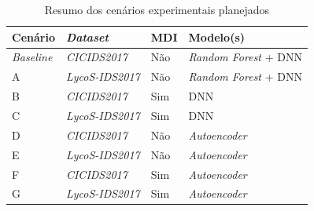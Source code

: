 \begin{table}[H]
\centering
\caption{Resumo dos cenários experimentais planejados}
\label{tab:cenarios_resumo}
\begin{tabular}{llll}
\hline
\textbf{Cenário} & \textbf{\textit{Dataset}} & \textbf{MDI} & \textbf{Modelo(s)} \\
\hline
\textit{Baseline} & \textit{CICIDS2017}    & Não & \textit{Random Forest} + DNN \\
A                 & \textit{LycoS-IDS2017} & Não & \textit{Random Forest} + DNN \\
B                 & \textit{CICIDS2017}    & Sim & DNN \\
C                 & \textit{LycoS-IDS2017} & Sim & DNN \\
D                 & \textit{CICIDS2017}    & Não & \textit{Autoencoder} \\
E                 & \textit{LycoS-IDS2017} & Não & \textit{Autoencoder} \\
F                 & \textit{CICIDS2017}    & Sim & \textit{Autoencoder} \\
G                 & \textit{LycoS-IDS2017} & Sim & \textit{Autoencoder} \\
\hline
\end{tabular}
\end{table}
